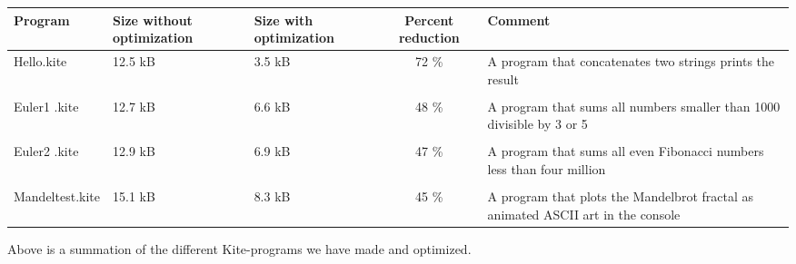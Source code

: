 \begin{center}
  \begin{tabulary}{0.9\textwidth}{|L| L |L| C | L | }
    \hline
    Program & Size without optimization & Size with optimization & Percent reduction & Comment \\
    \hline
    Hello.kite       & 12.5 kB & 3.5 kB & 72 \% & A program that concatenates two strings prints the result \\
    & & & & \\
    Euler1 .kite       & 12.7 kB & 6.6 kB & 48 \% & A program that sums all numbers smaller than 1000 divisible by 3 or 5 \\
    & & & & \\
    Euler2 .kite       & 12.9 kB & 6.9 kB & 47 \% & A program that sums all even Fibonacci numbers less than four million \\
    & & & & \\
    Mandeltest.kite       & 15.1 kB & 8.3 kB & 45 \% & A program that plots the Mandelbrot fractal as animated ASCII art in the console\\
    \hline
  \end{tabulary}

  Above is a summation of the different Kite-programs we have made and optimized.
\end{center}
